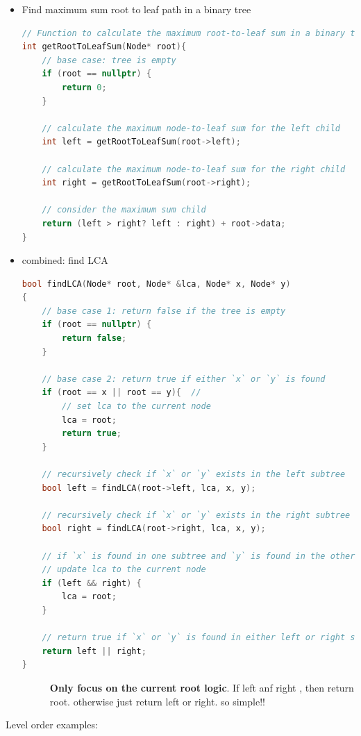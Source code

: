 \documentclass[a4paper,11pt,twoside]{book}
\begin{document}
\begin{itemize}
	\item Find maximum sum root to leaf path in a binary tree
\begin{lstlisting}[frame=single, language=c++]
// Function to calculate the maximum root-to-leaf sum in a binary tree
int getRootToLeafSum(Node* root){
	// base case: tree is empty
	if (root == nullptr) {
		return 0;
	}
	
	// calculate the maximum node-to-leaf sum for the left child
	int left = getRootToLeafSum(root->left);
	
	// calculate the maximum node-to-leaf sum for the right child
	int right = getRootToLeafSum(root->right);
	
	// consider the maximum sum child
	return (left > right? left : right) + root->data;
}	
\end{lstlisting}

\item combined:
find LCA
\begin{lstlisting}[frame=single, language=c++]
bool findLCA(Node* root, Node* &lca, Node* x, Node* y)
{
	// base case 1: return false if the tree is empty
	if (root == nullptr) {
		return false;
	}
	
	// base case 2: return true if either `x` or `y` is found
	if (root == x || root == y){  // 
		// set lca to the current node
		lca = root;
		return true;
	}
	
	// recursively check if `x` or `y` exists in the left subtree
	bool left = findLCA(root->left, lca, x, y);
	
	// recursively check if `x` or `y` exists in the right subtree
	bool right = findLCA(root->right, lca, x, y);
	
	// if `x` is found in one subtree and `y` is found in the other subtree,
	// update lca to the current node
	if (left && right) {
		lca = root;
	}
	
	// return true if `x` or `y` is found in either left or right subtree
	return left || right;
}
\end{lstlisting}
\begin{description}
	\item[] \textbf{Only focus on the current root logic}. If left anf right , then return root. otherwise just return left or right.  so simple!!
\end{description}

\end{itemize}

	\par Level order examples:
\end{document}
